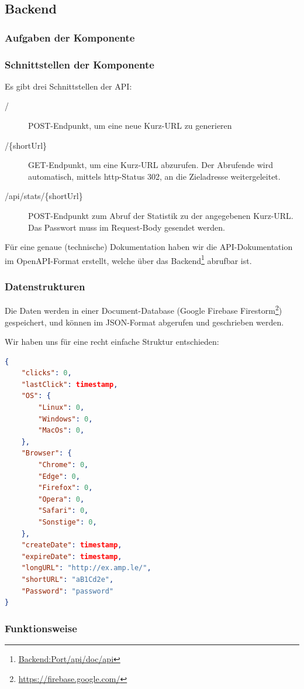 \documentclass[a4paper,11pt,DIV=12,overfullrule=on]{scrreprt}%
\begin{document}
\subsection{Backend}
\subsubsection{Aufgaben der Komponente}
\subsubsection{Schnittstellen der Komponente}
Es gibt drei Schnittstellen der \ac{API}:
\begin{description}
    \item[/] POST-Endpunkt, um eine neue Kurz-\ac{URL} zu generieren
    \item[/\{shortUrl\}] GET-Endpunkt, um eine Kurz-\ac{URL} abzurufen. Der Abrufende wird automatisch, mittels http-Status 302, an die Zieladresse weitergeleitet.
    \item[/api/stats/\{shortUrl\}] POST-Endpunkt zum Abruf der Statistik zu der angegebenen Kurz-\ac{URL}. Das Passwort muss im Request-Body gesendet werden.
\end{description}
Für eine genaue (technische) Dokumentation haben wir die \ac{API}-Dokumentation im OpenAPI-Format erstellt, welche über das Backend\footnote{\href{http://localhost:8080/api/doc/api}{Backend:Port/api/doc/api}} abrufbar ist.
\subsubsection{Datenstrukturen}
Die Daten werden in einer Document-Database (Google Firebase Firestorm\footnote{\href{https://firebase.google.com/}{https://firebase.google.com/}}) gespeichert, und können im \ac{JSON}-Format abgerufen und geschrieben werden.

Wir haben uns für eine recht einfache Struktur entschieden:
\begin{lstlisting}[language=json]
{
    "clicks": 0,
    "lastClick": timestamp,
    "OS": {
        "Linux": 0,
        "Windows": 0,
        "MacOs": 0,
    },
    "Browser": {
        "Chrome": 0,
        "Edge": 0,
        "Firefox": 0,
        "Opera": 0,
        "Safari": 0,
        "Sonstige": 0,
    },
    "createDate": timestamp,
    "expireDate": timestamp,
    "longURL": "http://ex.amp.le/",
    "shortURL": "aB1Cd2e",
    "Password": "password"
}
\end{lstlisting}
\subsubsection{Funktionsweise}
\end{document}
